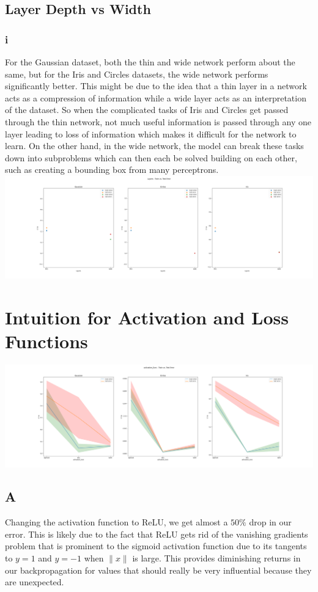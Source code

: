 \documentclass{article}
\begin{document}
\subsection{Layer Depth vs Width}
\subsubsection{i}
For the Gaussian dataset, both the thin and wide network perform about the same, but for the Iris and Circles datasets, the wide network performs significantly better. This might be due to the idea that a thin layer in a network acts as a compression of information while a wide layer acts as an interpretation of the dataset. So when the complicated tasks of Iris and Circles get passed through the thin network, not much useful information is passed through any one layer leading to loss of information which makes it difficult for the network to learn. On the other hand, in the wide network, the model can break these tasks down into subproblems which can then each be solved building on each other, such as creating a bounding box from many perceptrons. \\
\includegraphics[width=16cm]{layer_sizes}

\newpage
\section{Intuition for Activation and Loss Functions}
\includegraphics*[width=16cm]{activation_func}
\subsection{A}
Changing the activation function to ReLU, we get almost a $50\%$ drop in our error. This is likely due to the fact that ReLU gets rid of the vanishing gradients problem that is prominent to the sigmoid activation function due to its tangents to $y = 1$ and $y = -1$ when $\|x\|$ is large. This provides diminishing returns in our backpropagation for values that should really be very influential because they are unexpected.
\end{document}
